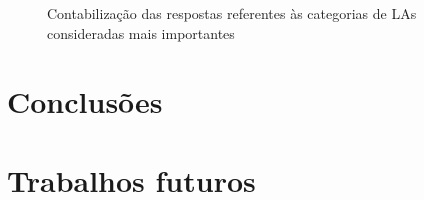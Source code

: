 \begin{figure}[H]
	\centering
	\captionsetup{justification=centering}
	\caption{Contabilização das respostas referentes às categorias de LAs consideradas mais importantes}
	\label{fig:result-cultura}
\end{figure}

\section{Conclusões}


\section{Trabalhos futuros}
